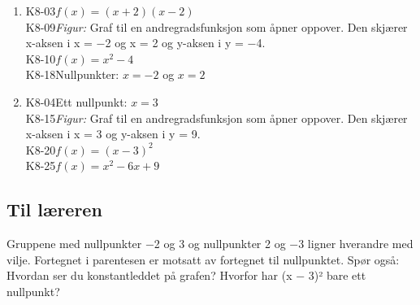 \documentclass[11pt,a4paper]{article}
\begin{document}
\begin{enumerate}[leftmargin=1.6em, itemsep=0.7em]
\item \begin{minipage}[t]{\linewidth}\textsf{\small K8-03}\quad $f(x) = (x + 2)(x - 2)$ \\ \textsf{\small K8-09}\quad \emph{Figur:} Graf til en andregradsfunksjon som åpner oppover. Den skjærer x-aksen i x = −2 og x = 2 og y-aksen i y = −4. \\ \textsf{\small K8-10}\quad $f(x) = x^2 - 4$ \\ \textsf{\small K8-18}\quad Nullpunkter: $x = -2$ og $x = 2$\end{minipage}
\item \begin{minipage}[t]{\linewidth}\textsf{\small K8-04}\quad Ett nullpunkt: $x = 3$ \\ \textsf{\small K8-15}\quad \emph{Figur:} Graf til en andregradsfunksjon som åpner oppover. Den skjærer x-aksen i x = 3 og y-aksen i y = 9. \\ \textsf{\small K8-20}\quad $f(x) = (x - 3)^2$ \\ \textsf{\small K8-25}\quad $f(x) = x^2 - 6x + 9$\end{minipage}
\end{enumerate}
\subsection*{Til læreren}
Gruppene med nullpunkter −2 og 3 og nullpunkter 2 og −3 ligner hverandre med vilje. Fortegnet i parentesen er motsatt av fortegnet til nullpunktet. Spør også: Hvordan ser du konstantleddet på grafen? Hvorfor har (x − 3)² bare ett nullpunkt?
\end{document}
